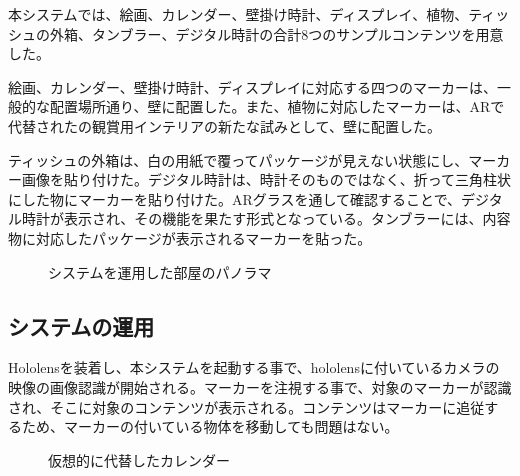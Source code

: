 本システムでは、絵画、カレンダー、壁掛け時計、ディスプレイ、植物、ティッシュの外箱、タンブラー、デジタル時計の合計8つのサンプルコンテンツを用意した。

絵画、カレンダー、壁掛け時計、ディスプレイに対応する四つのマーカーは、一般的な配置場所通り、壁に配置した。また、植物に対応したマーカーは、ARで代替されたの観賞用インテリアの新たな試みとして、壁に配置した。

ティッシュの外箱は、白の用紙で覆ってパッケージが見えない状態にし、マーカー画像を貼り付けた。デジタル時計は、時計そのものではなく、折って三角柱状にした物にマーカーを貼り付けた。ARグラスを通して確認することで、デジタル時計が表示され、その機能を果たす形式となっている。タンブラーには、内容物に対応したパッケージが表示されるマーカーを貼った。

\begin{figure}[htbp]
  \begin{center}
  \end{center}
  \caption{システムを運用した部屋のパノラマ}
  \label{fig:sample1}
\end{figure}

\subsection{システムの運用}

Hololensを装着し、本システムを起動する事で、hololensに付いているカメラの映像の画像認識が開始される。マーカーを注視する事で、対象のマーカーが認識され、そこに対象のコンテンツが表示される。コンテンツはマーカーに追従するため、マーカーの付いている物体を移動しても問題はない。

\begin{figure}[htbp]
  \begin{center}
  \end{center}
  \caption{仮想的に代替したカレンダー}
\end{figure}


